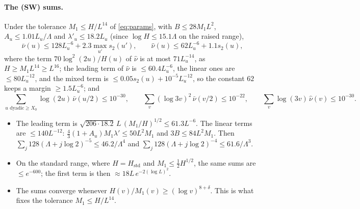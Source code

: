 \paragraph{The \textup{(SW)} sums.} Under the tolerance $M_1\le H/L^{14}$ of \eqref{eq:params}, with $B\le28M_1L^2$,
$A_u\le1.01L_u/\Lambda$ and $\lambda'_u\le18.2L_u$ (since $\log H\le15.1\Lambda$ on the raised range),
\[
  \bar\nu(u)\le128L_u^{-6}+2.3\max_{u'}s_2(u'),\qquad\hat\nu(u)\le62L_u^{-6}+1.1s_2(u),
\]
where the term $70\log^2(2u)/H(u)$ of $\hat\nu$ is at most $71L_u^{-14}$, as $H\ge M_1L^{14}\ge L^{16}$; the leading term of
$\hat\nu$ is $\le60.4L_u^{-6}$, the linear ones are $\le80L_u^{-12}$, and the mixed term is $\le0.05s_2(u)+10^{-5}L_u^{-12}$, so the
constant $62$ keeps a margin $\ge1.5L_u^{-6}$; and
\begin{equation}\label{eq:sw-sums}
  \sum_{u\text{ dyadic}\ge X_0}\log(2u)\,\bar\nu(u/2)\le10^{-30},\qquad
  \sum_v(\log3v)^2\,\bar\nu(v/2)\le10^{-22},\qquad
  \sum_v\log(3v)\,\hat\nu(v)\le10^{-30}.
\end{equation}
\begin{itemize}
\item The leading term is $\sqrt{206\cdot18.2}\,L\,(M_1/H)^{1/2}\le61.3L^{-6}$. The linear terms are $\le140L^{-12}$:
  $\frac43(1+A_u)M_1\lambda'\le50L^2M_1$ and $3B\le84L^2M_1$. Then $\sum_j128(\Lambda+j\log2)^{-5}\le46.2/\Lambda^4$ and
  $\sum_j128(\Lambda+j\log2)^{-4}\le61.6/\Lambda^3$.
\item On the standard range, where $H=H_{\mathrm{std}}$ and $M_1\le\frac12H^{1/2}$, the same sums are $\le e^{-600}$; the first
  term is then $\approx18L\,e^{-2(\log L)^2}$.
\item The sums converge whenever $H(v)/M_1(v)\ge(\log v)^{8+\delta}$. This is what fixes the tolerance $M_1\le H/L^{14}$.
\end{itemize}
